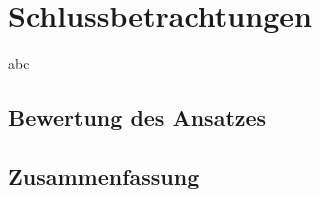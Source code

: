 \chapter{Schlussbetrachtungen}


abc

\section{Bewertung des Ansatzes}

\section{Zusammenfassung}

























